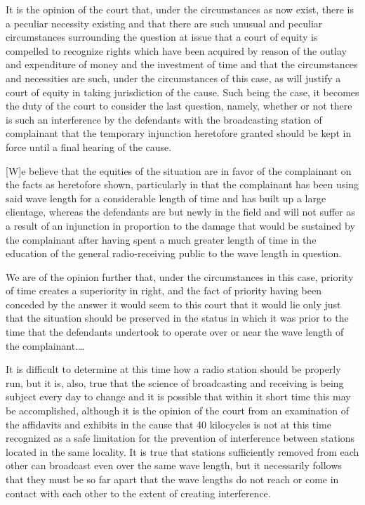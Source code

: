It is the opinion of the court that, under the circumstances as now exist, there
is a peculiar necessity existing and that there are such unusual and peculiar
circumstances surrounding the question at issue that a court of equity is
compelled to recognize rights which have been acquired by reason of the outlay
and expenditure of money and the investment of time and that the
circumstances and necessities are such, under the circumstances of this case,
as will justify a court of equity in taking jurisdiction of the cause. Such
being the case, it becomes the duty of the court to consider the last question,
namely, whether or not there is such an interference by the defendants with the
broadcasting station of complainant that the temporary injunction
heretofore granted should be kept in force until a final hearing of the
cause.

[W]e believe that the equities of the situation are in favor of the complainant
on the facts as heretofore shown, particularly in that the complainant has been
using said wave length for a considerable length of time and has built up a
large clientage, whereas the defendants are but newly in the field and will not
suffer as a result of an injunction in proportion to the damage that would be
sustained by the complainant after having spent a much greater length of time
in the education of the general radio-receiving public to the wave length in
question.

We are of the opinion further that, under the circumstances in this case,
priority of time creates a superiority in right, and the fact of priority
having been conceded by the answer it would seem to this court that it would
lie only just that the situation should be preserved in the status in which it
was prior to the time that the defendants undertook to operate over or near the
wave length of the complainant.\ldots

It is difficult to determine at this time how a radio station should be properly
run, but it is, also, true that the science of broadcasting and receiving is
being subject every day to change and it is possible that within it short time
this may be accomplished, although it is the opinion of the court from an
examination of the affidavits and exhibits in the cause that 40 kilocycles is
not at this time recognized as a safe limitation for the prevention of
interference between stations located in the same locality. It is true that
stations sufficiently removed from each other can broadcast even over the
same wave length, but it necessarily follows that they must be so far apart
that the wave lengths do not reach or come in contact with each other to the
extent of creating interference.

